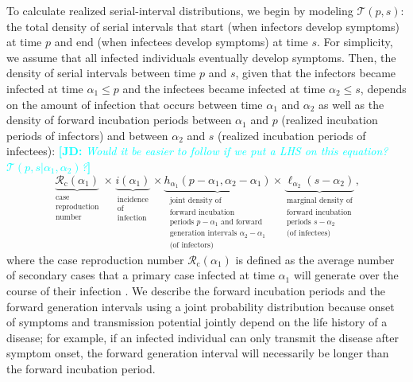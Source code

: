\documentclass[12pt]{article}
\newcommand{\comment}{\showcomment}
\newcommand{\showcomment}[3]{\textcolor{#1}{\textbf{[#2: }\textsl{#3}\textbf{]}}}
\newcommand{\jd}[1]{\comment{cyan}{JD}{#1}}
\newcommand{\Rx}[1]{\ensuremath{{\mathcal R}_{#1}}\xspace}
\newcommand{\Rc}{\Rx{\mathrm{c}}}
\newcommand{\psymp}{\ensuremath{p}} %
\newcommand{\ssymp}{\ensuremath{s}} %
\newcommand{\pinf}{\ensuremath{\alpha_1}} %
\newcommand{\sinf}{\ensuremath{\alpha_2}} %
\newcommand{\idist}{\ell} %
\newcommand{\total}{{\mathcal T}} %
\begin{document}
To calculate realized serial-interval distributions, we begin by modeling $\total(\psymp,\ssymp)$: the total density of serial intervals that start (when infectors develop symptoms) at time $\psymp$ and end (when infectees develop symptoms) at time $\ssymp$.
For simplicity, we assume that all infected individuals eventually develop symptoms.
Then, the density of serial intervals between time $\psymp$ and $\ssymp$,
given that the infectors became infected at time $\pinf\le\psymp$ and
the infectees became infected at time $\sinf\le\ssymp$, depends on the
amount of infection that occurs between time $\pinf$ and $\sinf$ as well as
the density of forward incubation periods between $\pinf$ and
$\psymp$ (realized incubation periods of infectors) and between
$\sinf$ and $\ssymp$ (realized incubation periods of infectees):
\jd{Would it be easier to follow if we put a LHS on this equation? 
$\total (\psymp,\ssymp | \alpha_1, \alpha_2)$?}
\begin{equation}
\underbrace{\Rc (\pinf)}_{\substack{\text{case} \\ \text{reproduction} \\ \text{number}}} 
\times 
\underbrace{i(\pinf)}_{\substack{\text{incidence} \\ \text{of} \\ \text{infection}}} 
\times 
\underbrace{h_{\pinf}(\psymp-\pinf, \sinf - \pinf)}_{\substack{\text{joint density of} \\ \text{forward incubation} \\ \text{periods } p-\pinf \text{ and forward} \\ \text{generation intervals } \sinf-\pinf\\ \text{(of infectors)}}}
\times
\underbrace{\idist_{\sinf}(\ssymp - \sinf)}_{\substack{\text{marginal density of} \\ \text{forward incubation} \\ \text{periods } \ssymp-\sinf \\ \text{(of infectees)}}},
\end{equation}
where the case reproduction number $\Rc (\pinf)$ is defined as the average number of secondary cases that a primary case infected at time $\pinf$ will generate over the course of their infection \citep{fraser2007estimating}.
We describe the forward incubation periods and the forward generation intervals using a joint probability distribution because onset of symptoms and transmission potential jointly depend on the life history of a disease;
for example, if an infected individual can only transmit the disease after symptom onset, the forward generation interval will necessarily be longer than the forward incubation period.
\end{document}
